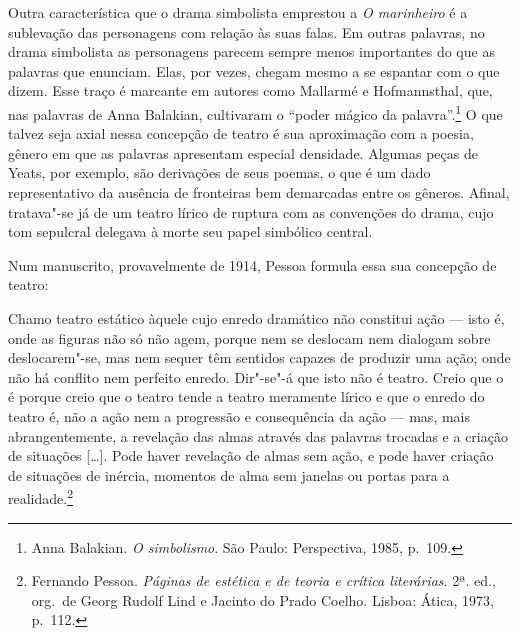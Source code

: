 Outra característica que o drama simbolista emprestou a \textit{O
marinheiro} é a sublevação das personagens com relação às suas
falas. Em outras palavras, no drama simbolista as personagens 
parecem sempre menos importantes do que as palavras que enunciam. 
Elas, por vezes, chegam mesmo a se espantar com o que dizem. 
Esse traço é marcante em autores como Mallarmé e Hofmannsthal, 
que, nas palavras de Anna Balakian, cultivaram o “poder mágico 
da palavra”.\footnote{ Anna Balakian.
\textit{O simbolismo}. São Paulo: 
Perspectiva, 1985, p.~109.} O que talvez seja axial 
nessa concepção de teatro é sua aproximação com a
poesia, gênero em que as palavras apresentam especial densidade.
Algumas peças de Yeats, por exemplo, são derivações de seus 
poemas, o que é um dado representativo da ausência de 
fronteiras bem demarcadas entre os gêneros.
Afinal, tratava"-se já de um teatro lírico de ruptura
com as convenções do drama, cujo tom sepulcral delegava
à morte seu papel simbólico central. 

Num manuscrito, provavelmente de 1914, Pessoa formula
essa sua concepção de teatro:

\begin{hedraquote}
Chamo teatro estático àquele cujo enredo 
dramático não constitui ação ---
isto é, onde as figuras não só não
agem, porque nem se deslocam nem
dialogam sobre deslocarem"-se, mas
nem sequer têm sentidos capazes de
produzir uma ação; onde não há conflito
nem perfeito enredo. Dir"-se"-á
que isto não é teatro. Creio que o é
porque creio que o teatro tende a
teatro meramente lírico e que o enredo
do teatro é, não a ação nem a
progressão e consequência da ação ---
mas, mais abrangentemente, a
revelação das almas através das 
palavras trocadas e a criação de
situações [\ldots{}]. Pode haver revelação
de almas sem ação, e pode haver
criação de situações de inércia, momentos 
de alma sem janelas ou portas
para a realidade.\footnote{ Fernando Pessoa. \textit{Páginas de estética e de teoria e crítica
literárias}. 2ª. ed., org.~de Georg Rudolf Lind e Jacinto do Prado
Coelho. Lisboa: Ática, 1973, p.~112.}
\end{hedraquote}

